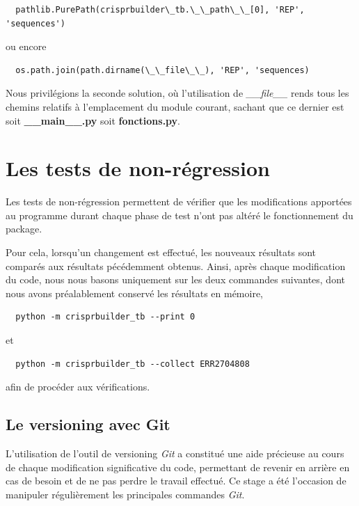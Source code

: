 \documentclass[twoside,a4paper,11pt,frenchb,openany]{report}
\begin{document}
\begin{enumerate}
\begin{verbatim}
  pathlib.PurePath(crisprbuilder\_tb.\_\_path\_\_[0], 'REP', 'sequences')
\end{verbatim}
ou encore
\begin{verbatim}
  os.path.join(path.dirname(\_\_file\_\_), 'REP', 'sequences)
\end{verbatim}
Nous privilégions la seconde solution, où l'utilisation de  \textit{\_\_file\_\_} rends tous les chemins relatifs à l'emplacement du module courant, sachant que ce dernier est soit \textbf{\_\_main\_\_.py} soit \textbf{fonctions.py}.  
\end{enumerate}






\section{Les tests de non-régression}

Les tests de non-régression permettent de vérifier que les modifications apportées au programme durant chaque phase de test n'ont pas altéré le fonctionnement du package.

Pour cela, lorsqu'un changement est effectué, les nouveaux résultats sont comparés aux résultats pécédemment obtenus. Ainsi, après chaque modification du code, nous nous basons uniquement sur les deux commandes suivantes, dont nous avons préalablement conservé les résultats en mémoire,

\begin{verbatim}  python -m crisprbuilder_tb --print 0\end{verbatim}

et 

\begin{verbatim}  python -m crisprbuilder_tb --collect ERR2704808\end{verbatim}

afin de procéder aux vérifications.




\subsection{Le versioning avec Git}

L'utilisation de l'outil de versioning \textit{Git} a constitué une aide précieuse au cours de chaque modification significative du code, permettant de revenir en arrière en cas de besoin et de ne pas perdre le travail effectué. Ce stage a été l'occasion de manipuler régulièrement les principales commandes \textit{Git}. 
\end{document}
